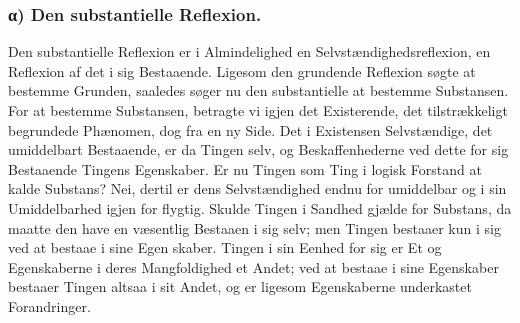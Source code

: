 \documentclass[11pt]{book}
\newcommand{\opage}[1]{\marginnote{\footnotesize\textit{[#1]}}}
\begin{document}
\subsubsection*{α) Den substantielle Reflexion.}

Den substantielle Reflexion er i Almindelighed en
Selvstændighedsreflexion, en Reflexion af det i sig Bestaaende.
Ligesom den grundende Reflexion søgte at bestemme Grunden, saaledes
søger nu den substantielle at bestemme Substansen. For at bestemme
Substansen, betragte vi igjen det Existerende, det tilstrækkeligt
begrundede Phænomen, dog fra en ny Side. Det i Existensen
Selvstændige, det umiddelbart Bestaaende, er da Tingen selv, og
Beskaffenhederne ved dette for sig Bestaaende Tingens Egenskaber.
Er nu Tingen som Ting i logisk Forstand at kalde Substans? Nei,
dertil er dens Selvstændighed endnu for umiddelbar og i sin
Umiddelbarhed igjen for flygtig. Skulde Tingen i Sandhed gjælde
for Substans, da maatte den have en væsentlig Bestaaen i sig selv;
men Tingen bestaaer kun i sig ved at bestaae i sine Egen\-%
\opage{107} \setcounter{footnote}{0}%
skaber. Tingen i sin Eenhed for sig er Et og Egenskaberne i deres
Mangfoldighed et Andet; ved at bestaae i sine Egenskaber bestaaer
Tingen altsaa i sit Andet, og er ligesom Egenskaberne underkastet
Forandringer.
\end{document}
